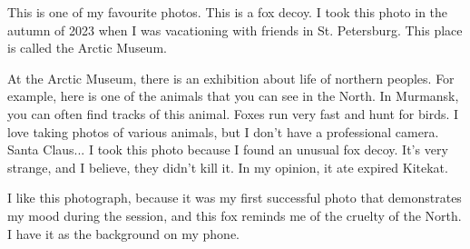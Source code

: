 \documentclass{article}
\begin{document}
\begin{minipage}{.4\textwidth}
This is one of my favourite photos. This is a fox decoy. I took this photo in the autumn of 2023 when I was vacationing with friends in St. Petersburg. This place is called the Arctic Museum.

At the Arctic Museum, there is an exhibition about life of northern peoples. For example, here is one of the animals that you can see in the North. In Murmansk, you can often find tracks of this animal. Foxes run very fast and hunt for birds. I love taking photos of various animals, but I don't have a professional camera. Santa Claus...
I took this photo because I found an unusual fox decoy. It's very strange, and I believe, they didn't kill it. In my opinion, it ate expired Kitekat.

I like this photograph, because it was my first successful photo that demonstrates my mood during the session, and this fox reminds me of the cruelty of the North. I have it as the background on my phone.
\end{minipage}
\end{document}
